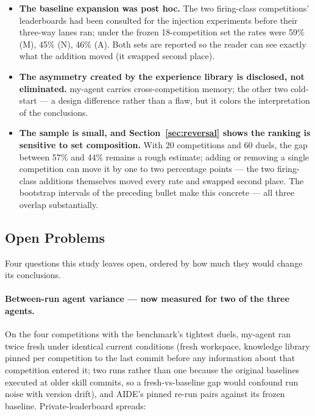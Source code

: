 \documentclass[11pt,a4paper]{article}
\begin{document}
\begin{itemize}[leftmargin=*]
  reproduction; each method runs ``as shipped,'' so the win rates compare methods-with-their-budgets,
  not methods at equal compute.
  \item \textbf{The baseline expansion was post hoc.} The two firing-class competitions'
  leaderboards had been consulted for the injection experiments before their three-way lanes
  ran; under the frozen 18-competition set the rates were 59\% (M), 45\% (N), 46\% (A).
  Both sets are reported so the reader can see exactly what the addition moved (it swapped
  second place).
  \item \textbf{The asymmetry created by the experience library is disclosed, not eliminated.} my-agent carries cross-competition memory; the other two cold-start --- a design difference rather than a flaw, but it colors the interpretation of the conclusions.
  \item \textbf{The sample is small, and Section~\ref{sec:reversal} shows the ranking is sensitive to set composition.} With 20 competitions and 60 duels, the gap between 57\% and 44\% remains a rough estimate; adding or removing a single competition can move it by one to two percentage points --- the two firing-class additions themselves moved every rate and swapped second place. The bootstrap intervals of the preceding bullet make this concrete --- all three overlap substantially.
\end{itemize}

\subsection{Open Problems}
\label{sec:future}

Four questions this study leaves open, ordered by how much they would change its conclusions.

\paragraph{Between-run agent variance --- now measured for two of the three agents.} On the
four competitions with the benchmark's tightest duels, my-agent ran twice fresh under
identical current conditions (fresh workspace, knowledge library pinned per competition to
the last commit before any information about that competition entered it; two runs rather
than one because the original baselines executed at older skill commits, so a fresh-vs-baseline
gap would confound run noise with version drift), and AIDE's pinned re-run pairs against its
frozen baseline. Private-leaderboard spreads:
\end{document}
